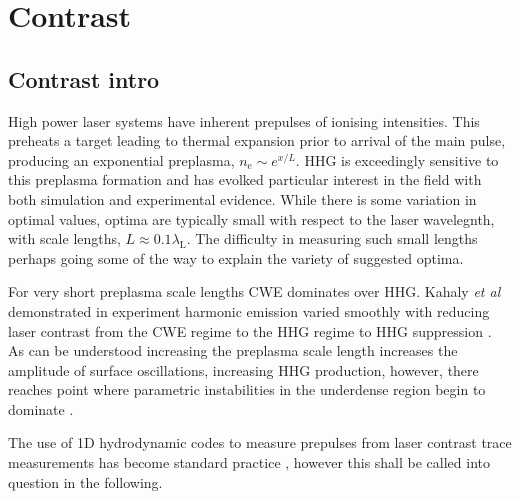 \section{Contrast}

\subsection{Contrast intro}
High power laser systems have inherent prepulses of ionising intensities. This preheats a target leading to thermal expansion prior to arrival of the main pulse, producing an exponential preplasma, $n_\mathrm{e} \sim e^{x/L}$. HHG is exceedingly sensitive to this preplasma formation and has evolked particular interest in the field \cite{behmkeControllingSpacingAttosecond2011, rodelHarmonicGenerationRelativistic2012, dollarScalingHighorderHarmonic2013, kahalyDirectObservationDensityGradient2013, vincentiAchievingExtremeLight2019,behmkeControllingSpacingAttosecond2011} with both simulation and experimental evidence. While there is some variation in optimal values, optima are typically small with respect to the laser wavelegnth, with scale lengths, $L \approx 0.1 \lambda_\mathrm{L}$. The difficulty in measuring such small lengths perhaps going some of the way to explain the variety of suggested optima. 

For very short preplasma scale lengths \ac{CWE} dominates over HHG. Kahaly \textit{et al} demonstrated in experiment harmonic emission varied smoothly with reducing laser contrast from the CWE regime to the HHG regime to HHG suppression \cite{kahalyDirectObservationDensityGradient2013}. As can be understood increasing the preplasma scale length increases the amplitude of surface oscillations, increasing HHG production, however, there reaches point where parametric instabilities in the underdense region begin to dominate \cite{dollarScalingHighorderHarmonic2013}.

The use of 1D hydrodynamic codes to measure prepulses from laser contrast trace measurements has become standard practice \cite{behmkeControllingSpacingAttosecond2011, dollarScalingHighorderHarmonic2013, liExperimentalDemonstrationEfficient2022}, however this shall be called into question in the following.

